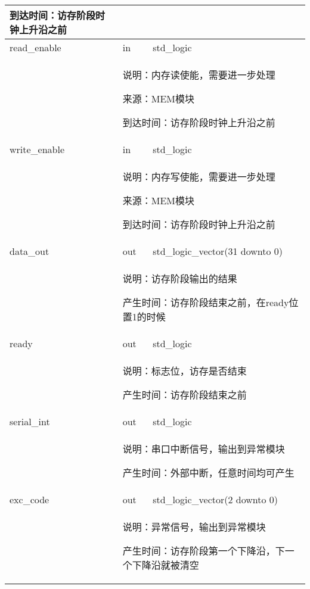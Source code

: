 \begin{tabularx}{\textwidth}{lll}
{                到达时间：访存阶段时钟上升沿之前
            } \\
            \midrule
            read\_enable       & in        & std\_logic \\
            \cmidrule(l){2-3}
            &
            \multicolumn{2}{X}{
                说明：内存读使能，需要进一步处理

                来源：MEM模块

                到达时间：访存阶段时钟上升沿之前
            } \\
            \midrule
            write\_enable & in      & std\_logic \\
            \cmidrule(l){2-3}
            &
            \multicolumn{2}{X}{
                说明：内存写使能，需要进一步处理

                来源：MEM模块

                到达时间：访存阶段时钟上升沿之前
            } \\
            \midrule
            data\_out      & out        & std\_logic\_vector(31 downto 0) \\
            \cmidrule(l){2-3}
            &
            \multicolumn{2}{X}{
                说明：访存阶段输出的结果

                产生时间：访存阶段结束之前，在ready位置1的时候
            } \\
            \midrule
            ready   & out        & std\_logic \\
            \cmidrule(l){2-3}
            &
            \multicolumn{2}{X}{
                说明：标志位，访存是否结束

                产生时间：访存阶段结束之前
            } \\
            \midrule
            serial\_int      & out       & std\_logic \\
            \cmidrule(l){2-3}
            &
            \multicolumn{2}{X}{
                说明：串口中断信号，输出到异常模块

                产生时间：外部中断，任意时间均可产生
            } \\
            \midrule
            exc\_code      & out       & std\_logic\_vector(2 downto 0) \\
            \cmidrule(l){2-3}
            &
            \multicolumn{2}{X}{
                说明：异常信号，输出到异常模块

                产生时间：访存阶段第一个下降沿，下一个下降沿就被清空

}
\end{tabularx}
